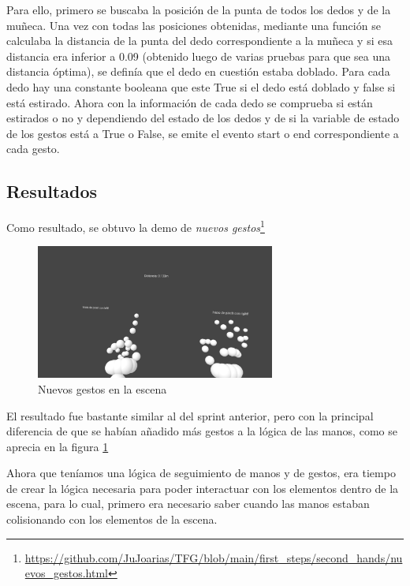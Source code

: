 \documentclass[a4paper, 12pt]{book}
\begin{document}
Para ello, primero se buscaba la posición de la punta de todos los dedos y de la muñeca. Una vez con todas las posiciones obtenidas, mediante una función se calculaba la distancia de la punta del dedo correspondiente a la muñeca y si esa distancia era inferior a 0.09 (obtenido luego de varias pruebas para que sea una distancia óptima), se definía que el dedo en cuestión estaba doblado.
Para cada dedo hay una constante booleana que este True si el dedo está doblado y false si está estirado. Ahora con la información de cada dedo se comprueba si están estirados o no y dependiendo del estado de los dedos y de si la variable de estado de los gestos está a True o False, se emite el evento start o end correspondiente a cada gesto. 

\subsection{Resultados}
\label{subsec:resultados3}
Como resultado, se obtuvo la demo de \textit{nuevos gestos}\footnote{\url{https://github.com/JuJoarias/TFG/blob/main/first_steps/second_hands/nuevos_gestos.html}}

\begin{figure}[H] 
  \centering
  \includegraphics[width=0.7\textwidth]{img/nuevos_gestos.jpg} 
  \caption{Nuevos gestos en la escena}
  \label{fig:sprint3}
\end{figure}

El resultado fue bastante similar al del sprint anterior, pero con la principal diferencia de que se habían añadido más gestos a la lógica de las manos, como se aprecia en la figura \ref{fig:sprint3}

Ahora que teníamos una lógica de seguimiento de manos y de gestos, era tiempo de crear la lógica necesaria para poder interactuar con los elementos dentro de la escena, para lo cual, primero era necesario saber cuando las manos estaban colisionando con los elementos de la escena. 
\end{document}
